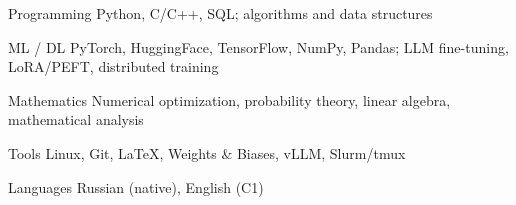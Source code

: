 
\begin{cvskills}

  \cvskill
    {Programming} %
    {Python, C/C++, SQL; algorithms and data structures} %

  \cvskill
    {ML / DL} %
    {PyTorch, HuggingFace, TensorFlow, NumPy, Pandas; LLM fine-tuning, LoRA/PEFT, distributed training} %

  \cvskill
    {Mathematics} %
    {Numerical optimization, probability theory, linear algebra, mathematical analysis} %

  \cvskill
    {Tools} %
    {Linux, Git, \LaTeX, Weights \& Biases, vLLM, Slurm/tmux} %

  \cvskill
    {Languages} %
    {Russian (native), English (C1)} %

\end{cvskills}
